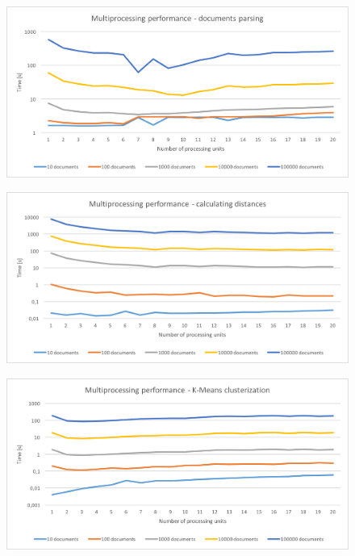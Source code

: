 \begin{figure}
\begin{center}
 \includegraphics[width=0.9\linewidth]{images/tests/mp-doc-parsing.png}
 \caption{ }
 \label{mp-doc-parsing}
 \end{center}
 \end{figure}
 
 \begin{figure}
\begin{center}
 \includegraphics[width=0.9\linewidth]{images/tests/mp-distances.png}
 \caption{ }
 \label{mp-distances}
 \end{center}
 \end{figure}
 
  \begin{figure}
\begin{center}
 \includegraphics[width=0.9\linewidth]{images/tests/mp-kmeans.png}
 \caption{ }
 \label{mp-kmeans}
 \end{center}
 \end{figure}
 

